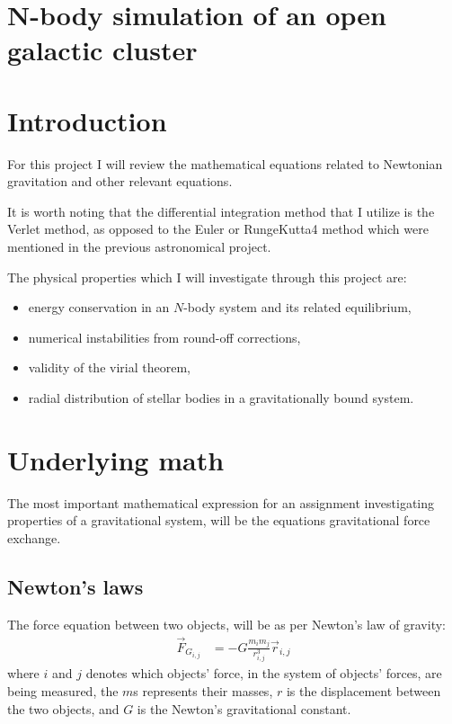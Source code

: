\documentclass[11pt,a4paper,notitlepage,twocolumn]{article}
\begin{document}


\newpage

\section*{N-body simulation of an open galactic cluster}
\section{Introduction}
For this project I will review the mathematical equations related to Newtonian gravitation and other relevant equations.

It is worth noting that the differential integration method that I utilize is the Verlet method, as opposed to the Euler or RungeKutta4 method which were mentioned in the previous astronomical project.

The physical properties which I will investigate through this project are:
\begin{itemize}
\item energy conservation in an $N$-body system and its related equilibrium,
\item numerical instabilities from round-off corrections,
\item validity of the virial theorem,
\item radial distribution of stellar bodies in a gravitationally bound system.
\end{itemize}

\section{Underlying math}
The most important mathematical expression for an assignment investigating properties of a gravitational system, will be the equations gravitational force exchange.
\subsection{Newton's laws}
The force equation between two objects, will be as per Newton's law of gravity:
\begin{align}\label{eq:gravlaw}
\vec{F}_{G_{i,j}} &= -G\frac{m_i m_j}{r^3_{i,j}}\vec{r}_{i,j}
\end{align}
where $i$ and $j$ denotes which objects' force, in the system of objects' forces, are being measured, the $m$s represents their masses, $r$ is the displacement between the two objects, and $G$ is the Newton's gravitational constant.
\end{document}
